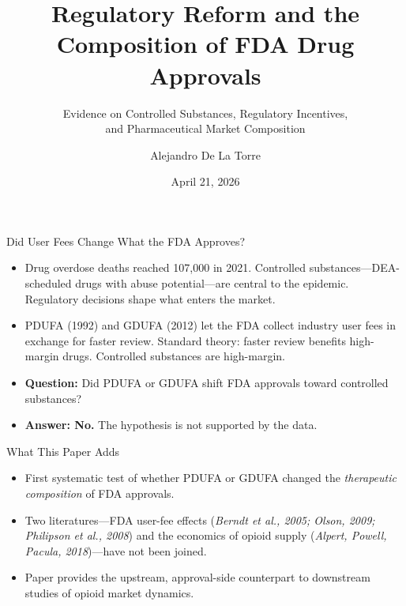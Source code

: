 \documentclass[10pt]{beamer}
\title{Regulatory Reform and the Composition of FDA Drug Approvals}
\subtitle{Evidence on Controlled Substances, Regulatory Incentives,\\
          and Pharmaceutical Market Composition}
\author{Alejandro De La Torre}
\institute{University of Wisconsin--Madison~$\cdot$~ECON 580}
\date{April 21, 2026}
\newcommand{\pdufahl}[1]{\textcolor{pdufacolor}{#1}}
\newcommand{\cshl}[1]{\textcolor{cscolor}{#1}}
\begin{document}

\begin{frame}
  \titlepage
\end{frame}


\begin{frame}{Did User Fees Change What the FDA Approves?}

  \begin{itemize}
    \item<1->
      Drug overdose deaths reached 107{,}000 in 2021.
      \cshl{Controlled substances}---DEA-scheduled drugs with abuse
      potential---are central to the epidemic.
      Regulatory decisions shape what enters the market.

    \item<2->
      \pdufahl{PDUFA (1992)} and \pdufahl{GDUFA (2012)} let the FDA
      collect industry user fees in exchange for faster review.
      Standard theory: faster review benefits high-margin drugs.
      \cshl{Controlled substances} are high-margin.

    \item<3->
      \textbf{Question:} Did \pdufahl{PDUFA} or \pdufahl{GDUFA} shift
      FDA approvals toward \cshl{controlled substances}?

    \item<4->
      \textbf{\cshl{Answer: No.}}\quad
      The hypothesis is not supported by the data.
  \end{itemize}

\end{frame}


\begin{frame}{What This Paper Adds}

  \begin{itemize}
    \item
      First systematic test of whether \pdufahl{PDUFA} or \pdufahl{GDUFA}
      changed the \textit{therapeutic composition} of FDA approvals.

    \item
      Two literatures---FDA user-fee effects
      (\textit{Berndt et al., 2005; Olson, 2009; Philipson et al., 2008})
      and the economics of opioid supply
      (\textit{Alpert, Powell, Pacula, 2018})---have not been joined.

    \item
      Paper provides the upstream, approval-side counterpart to downstream
      studies of \cshl{opioid market dynamics}.
  \end{itemize}

\end{frame}
\end{document}
